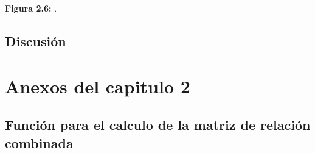 \documentclass[11pt,spanish,a4paper,oneside,]{book} %
\begin{document}
\begin{center}
\textbf{Figura 2.6:} .

\end{center}

\hypertarget{discussion2}{%
\section{Discusión}\label{discussion2}}

\hypertarget{appendix-appendix}{%
\appendix}


\hypertarget{anexos-del-capitulo-2}{%
\chapter{Anexos del capitulo 2}\label{anexos-del-capitulo-2}}

\hypertarget{funciuxf3n-para-el-calculo-de-la-matriz-de-relaciuxf3n-combinada}{%
\section{Función para el calculo de la matriz de relación combinada}\label{funciuxf3n-para-el-calculo-de-la-matriz-de-relaciuxf3n-combinada}}
\end{document}
